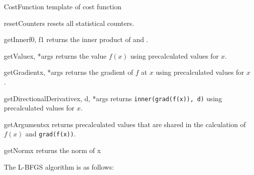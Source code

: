 
\begin{classdesc}{CostFunction}{}
template of cost function
\end{classdesc}

\begin{methoddesc}[CostFunction]{resetCounters}{}
    resets all statistical counters.
\end{methoddesc}
%
\begin{methoddesc}[CostFunction]{getInner}{f0, f1}
    returns the inner product of  and .
\end{methoddesc}
%
\begin{methoddesc}[CostFunction]{getValue}{x, *args}
    returns the value $f(x)$ using precalculated values for $x$.
\end{methoddesc}
%
\begin{methoddesc}[CostFunction]{getGradient}{x, *args}
    returns the gradient of $f$ at $x$ using precalculated values for $x$.
\end{methoddesc}
%
\begin{methoddesc}[CostFunction]{getDirectionalDerivative}{x, d, *args}
    returns \texttt{inner(grad(f(x)), d)} using precalculated values for $x$.
\end{methoddesc}
%
\begin{methoddesc}[CostFunction]{getArguments}{x}
    returns precalculated values that are shared in the calculation of $f(x)$
    and \texttt{grad(f(x))}.
\end{methoddesc}
\begin{methoddesc}[CostFunction]{getNorm}{x}
returns the norm of x
\end{methoddesc}


The L-BFGS algorithm is as follows:

